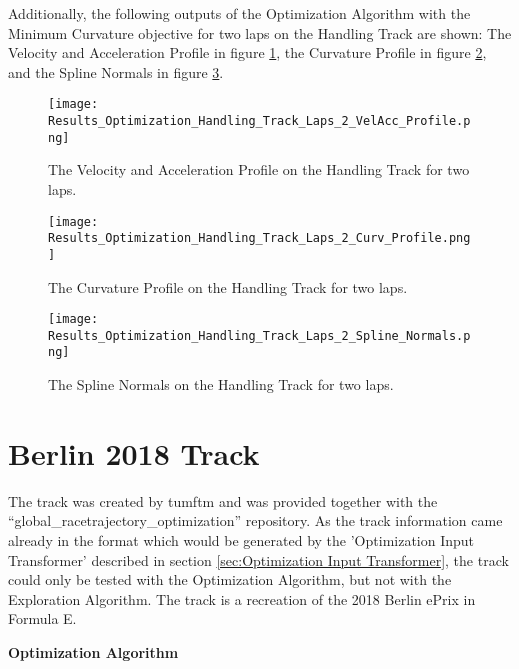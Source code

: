 Additionally, the following outputs of the Optimization Algorithm with the Minimum Curvature objective for two laps on the Handling Track are shown: The Velocity and Acceleration Profile in figure \ref{fig:Results Handling Track Laps 2 VelAcc Profile}, the Curvature Profile in figure \ref{fig:Results Handling Track Laps 2 Curv Profile}, and the Spline Normals in figure \ref{fig:Results Handling Track Laps 2 Spline Normals}.
\begin{figure}[H]
    \centering
    \texttt{[image: Results\_Optimization\_Handling\_Track\_Laps\_2\_VelAcc\_Profile.png]}
    \caption{The Velocity and Acceleration Profile on the Handling Track for two laps.}
    \label{fig:Results Handling Track Laps 2 VelAcc Profile}
\end{figure}
\begin{figure}[H]
    \centering
    \texttt{[image: Results\_Optimization\_Handling\_Track\_Laps\_2\_Curv\_Profile.png]}
    \caption{The Curvature Profile on the Handling Track for two laps.}
    \label{fig:Results Handling Track Laps 2 Curv Profile}
\end{figure}
\begin{figure}[H]
    \centering
    \texttt{[image: Results\_Optimization\_Handling\_Track\_Laps\_2\_Spline\_Normals.png]}
    \caption{The Spline Normals on the Handling Track for two laps.}
    \label{fig:Results Handling Track Laps 2 Spline Normals}
\end{figure}

\pagebreak

\section{Berlin 2018 Track} \label{sec:Results Berlin 2018 Track}
The track was created by \acrshort{tumftm} and was provided together with the ``global\_racetrajectory\_optimization'' repository. \cite{tumftm_optimization_algoritm}
As the track information came already in the format which would be generated by the 'Optimization Input Transformer' described in section \ref{sec:Optimization Input Transformer}, the track could only be tested with the Optimization Algorithm, but not with the Exploration Algorithm. The track is a recreation of the 2018 Berlin ePrix in Formula E. \cite{formula_e_berlin_eprix}

\textbf{Optimization Algorithm}

